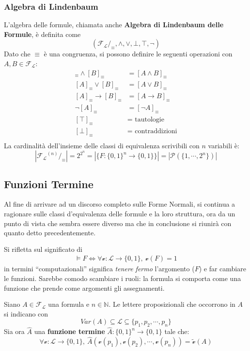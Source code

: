 \subsubsection{Algebra di Lindenbaum}
L'algebra delle formule, chiamata anche \textbf{Algebra di 
Lindenbaum delle Formule}, è definita come 
$$
(\mathscr{F_L}/_{\equiv}, \land, \lor, \bot, \top, \neg)
$$
Dato che $\equiv$ è una congruenza, si possono definire le seguenti operazioni con $A,B \in \mathscr{F_L}$:
\begin{align*}
  [A]_{\equiv} \land [B]_{\equiv} & = [A \land B]_{\equiv} \\
  [A]_{\equiv} \lor [B]_{\equiv} & = [A \lor B]_{\equiv} \\
  [A]_{\equiv} \rightarrow [B]_{\equiv} & = [A \rightarrow B]_{\equiv} \\
  \neg [A]_{\equiv} & = [\neg A]_{\equiv} \\
  [\top]_{\equiv} & = \text{ tautologie} \\
  [\bot]_{\equiv} & = \text{ contraddizioni} \\
\end{align*}
La cardinalità dell'insieme delle classi di equivalenza scrivibili con $n$ variabili è:
$$
|\mathscr{F_L}^{(n)}/_\equiv| = 2 ^ {2^n} = |\{F: \{0,1\}^n \rightarrow \{0,1\}\}| = |\mathscr{P}(\{1,\cdots,2^n\})|
$$

\subsection{Funzioni Termine}
Al fine di arrivare ad un discorso completo sulle Forme Normali, si continua a ragionare sulle classi d'equivalenza delle formule e la loro struttura, ora da un punto di vista che sembra essere diverso ma che in conclusione si riunirà con quanto detto precedentemente. 

Si rifletta sul significato di 
\begin{align}
\label{fun:formula-computazionale}
\models F \iff \forall \mathcal{v}: \mathscr{L} \rightarrow \{0,1\},\ \mathcal{v}(F) = 1
\end{align}
in termini ``computazionali'' significa \textit{tenere fermo} l'argomento ($F$) e far cambiare le funzioni. Sarebbe comodo scambiare i ruoli: la formula si comporta come una funzione che prende come argomenti gli assegnamenti.

Siano $A \in \mathscr{F_L}$ una formula e $n \in \mathbb{N}$. Le lettere proposizionali che occorrono in $A$ si indicano con
$$
Var(A) \subseteq \mathscr{L} \subseteq \{p_1, p_2, \cdots, p_n\}
$$
Sia ora $\hat{A}$ una \textbf{funzione termine} $\hat{A} : \{0,1\}^n \rightarrow \{0,1\}$ tale che:
$$
\forall \mathcal{v}:\mathscr{L} \rightarrow \{0,1\},\ \hat{A}(\mathcal{v}(p_1), \mathcal{v}(p_2), \cdots, \mathcal{v}(p_n)) = \widetilde{\mathcal{v}}(A)
$$


